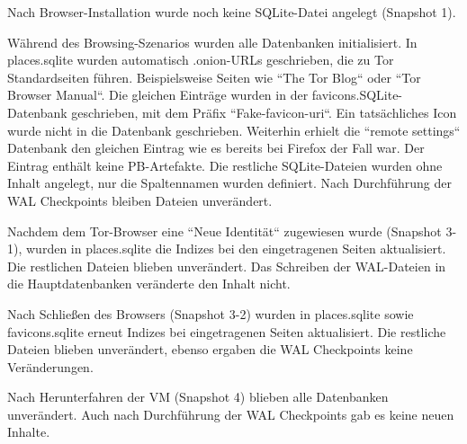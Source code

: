 \begin{appendices}
\begin{table}[h!]
{\begin{tabular}{|l|c|cc|cc|cc|cc|}
\end{tabular}
}
\end{table}

Nach Browser-Installation wurde noch keine SQLite-Datei angelegt (Snapshot 1).

Während des Browsing-Szenarios wurden alle Datenbanken initialisiert.
In places.sqlite wurden automatisch .onion-URLs geschrieben, die zu Tor Standardseiten führen. Beispielsweise Seiten wie ``The Tor Blog`` oder ``Tor Browser Manual``.
Die gleichen Einträge wurden in der favicons.SQLite-Datenbank geschrieben, mit dem Präfix ``Fake-favicon-uri``. Ein tatsächliches Icon wurde nicht in die Datenbank geschrieben. 
Weiterhin erhielt die ``remote settings`` Datenbank den gleichen Eintrag wie es bereits bei Firefox der Fall war. Der Eintrag enthält keine PB-Artefakte.
Die restliche SQLite-Dateien wurden ohne Inhalt angelegt, nur die Spaltennamen wurden definiert.
Nach Durchführung der WAL Checkpoints bleiben Dateien unverändert.

Nachdem dem Tor-Browser eine ``Neue Identität`` zugewiesen wurde (Snapshot 3-1), wurden in places.sqlite die Indizes bei den eingetragenen Seiten aktualisiert. Die restlichen Dateien blieben unverändert. Das Schreiben der WAL-Dateien in die Hauptdatenbanken veränderte den Inhalt nicht.

Nach Schließen des Browsers (Snapshot 3-2) wurden in places.sqlite sowie favicons.sqlite erneut Indizes bei eingetragenen Seiten aktualisiert. Die restliche Dateien blieben unverändert, ebenso ergaben die WAL Checkpoints keine Veränderungen.

Nach Herunterfahren der VM (Snapshot 4) blieben alle Datenbanken unverändert. Auch nach Durchführung der WAL Checkpoints gab es keine neuen Inhalte.


\end{appendices}
